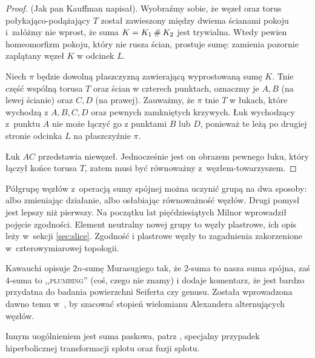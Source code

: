 \begin{proof}
    (Jak pan Kauffman \cite[s. 18-20]{kauffman1995} napisał).
    Wyobraźmy sobie, że węzeł oraz torus połykająco-podążający $T$ został zawieszony między dwiema ścianami pokoju i~załóżmy nie wprost, że suma $K = K_1 \mathbin{\#} K_2$ jest trywialna.
    Wtedy pewien homeomorfizm pokoju, który nie rusza ścian, prostuje sumę: zamienia pozornie zaplątany węzeł $K$ w odcinek $L$. 

    Niech $\pi$ będzie dowolną płaszczyzną zawierającą wyprostowaną sumę $K$.
    Tnie część wspólną torusa $T$ oraz ścian w czterech punktach, oznaczmy je $A, B$ (na lewej ścianie) oraz $C, D$ (na prawej).
    Zauważmy, że $\pi$ tnie $T$ w łukach, które wychodzą z $A, B, C, D$ oraz pewnych zamkniętych krzywych.
    Łuk wychodzący z~punktu $A$ nie może łączyć go z punktami $B$ lub $D$, ponieważ te leżą po drugiej stronie odcinka $L$ na płaszczyźnie $\pi$.
    
    Łuk $AC$ przedstawia niewęzeł.
    Jednocześnie jest on obrazem pewnego łuku, który łączył końce torusa $T$, zatem musi być równoważny z~węzłem-towarzyszem.
\end{proof}

Półgrupę węzłów z~operacją sumy spójnej można uczynić grupą na dwa sposoby: albo zmieniając działanie, albo osłabiając równoważność węzłów.
Drugi pomysł jest lepszy niż pierwszy.
Na początku lat pięćdziesiątych Milnor wprowadził pojęcie zgodności.
%
%
%
Element neutralny nowej grupy to węzły plastrowe, ich opis leży w~sekcji \ref{sec:slice}.
Zgodność i plastrowe węzły to zagadnienia zakorzenione w~czterowymiarowej topologii.

Kawauchi \cite[s. 50-53]{kawauchi1996} opisuje $2n$-sumę Murasugiego tak, że $2$-suma to nasza suma spójna, zaś $4$-suma to \textsc{,,plumbing''} (coś, czego nie znamy) i dodaje komentarz, że jest bardzo przydatna do badania powierzchni Seiferta czy genusu.
%
%
Została wprowadzona dawno temu w~\cite{murasugi1958}, by szacować stopień wielomianu Alexandera alternujących węzłów.
%
%
%

Innym uogólnieniem jest suma paskowa, patrz \cite[s. 31-32, 43]{kawauchi1996}, specjalny przypadek hiperbolicznej transformacji splotu oraz fuzji splotu.
%


